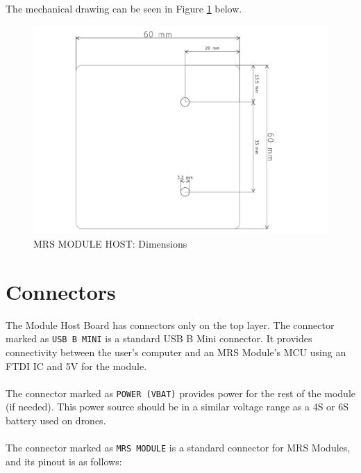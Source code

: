 \documentclass[12pt, a4paper]{article}
\begin{document}
The mechanical drawing can be seen in Figure \ref{fig:dimensions} below.

\begin{figure}[h]
\centering
\includegraphics[width=\textwidth]{figures/Dimensions.pdf}
\caption{MRS MODULE HOST: Dimensions}
\label{fig:dimensions}
\end{figure}

\pagebreak
\section{Connectors}
The Module Host Board has connectors only on the top layer.
The connector marked as \verb|USB B MINI| is a standard USB B Mini connector. It provides connectivity between the user's computer and an MRS Module's MCU using an FTDI IC and 5V for the module.\\
\\
The connector marked as \verb|POWER (VBAT)| provides power for the rest of the module (if needed). This power source should be in a similar voltage range as a 4S or 6S battery used on drones.\\
\\
The connector marked as \verb|MRS MODULE| is a standard connector for MRS Modules, and its pinout is as follows:
\end{document}
